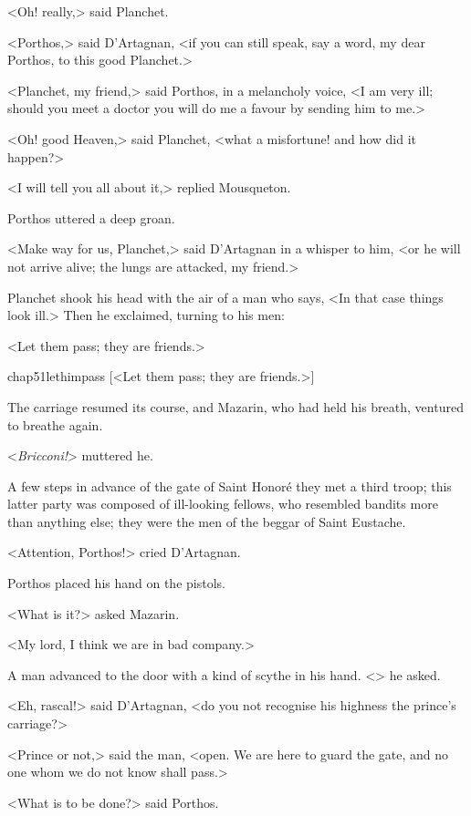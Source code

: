 <Oh! really,> said Planchet.

<Porthos,> said D'Artagnan, <if you can still speak, say a word, my dear Porthos, to this good Planchet.>

<Planchet, my friend,> said Porthos, in a melancholy voice, <I am very ill; should you meet a doctor you will do me a favour by sending him to me.>

<Oh! good Heaven,> said Planchet, <what a misfortune! and how did it happen?>

<I will tell you all about it,> replied Mousqueton.

Porthos uttered a deep groan.

<Make way for us, Planchet,> said D'Artagnan in a whisper to him, <or he will not arrive alive; the lungs are attacked, my friend.>

Planchet shook his head with the air of a man who says, <In that case things look ill.> Then he exclaimed, turning to his men:

<Let them pass; they are friends.>

\begin{bwbigpic}
	[\basicscale] 
	{chap51lethimpass}
	[<Let them pass; they are friends.>]
\end{bwbigpic}

The carriage resumed its course, and Mazarin, who had held his breath, ventured to breathe again.

<\emph{Bricconi!}> muttered he.

A few steps in advance of the gate of Saint Honoré they met a third troop; this latter party was composed of ill-looking fellows, who resembled bandits more than anything else; they were the men of the beggar of Saint Eustache.

<Attention, Porthos!> cried D'Artagnan.

Porthos placed his hand on the pistols.

<What is it?> asked Mazarin.

<My lord, I think we are in bad company.>

A man advanced to the door with a kind of scythe in his hand. <> he asked.

<Eh, rascal!> said D'Artagnan, <do you not recognise his highness the prince's carriage?>

<Prince or not,> said the man, <open. We are here to guard the gate, and no one whom we do not know shall pass.>

<What is to be done?> said Porthos.


